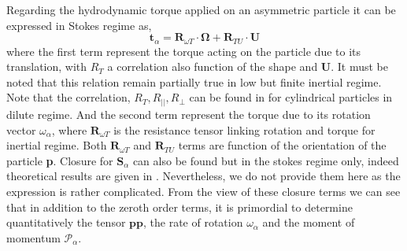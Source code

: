 Regarding the hydrodynamic torque applied on an asymmetric particle it can be expressed in Stokes regime as, 
\begin{equation}
    \textbf{t}_\alpha 
    = 
    \textbf{R}_{\omega T}\cdot \mathbf{\Omega}
     + \textbf{R}_{TU} \cdot \textbf{U} 
\end{equation}
where the first term represent the torque acting on the particle due to its translation,
with $R_T$ a correlation also function of the shape and $\textbf{U}$.
It must be noted that this relation remain partially true in low but finite inertial regime. 
Note that the correlation,  $R_T, R_{||} , R_{\bot}$ can be found in \citet{fintzi2023inertial} for cylindrical particles in dilute regime. 
And the second term represent the torque due to its rotation vector $\omega_\alpha$, where $\textbf{R}_{\omega T}$ is the resistance tensor linking rotation and torque \citet{pierson2021hydrodynamic} for inertial regime.  
Both $\textbf{R}_{\omega T}$ and $\textbf{R}_{TU}$ terms are function of the orientation of the particle \textbf{p}.
Closure for $\textbf{S}_\alpha$ can also be found but in the stokes regime only, 
indeed theoretical results are given in \citet[p 62]{kim2013microhydrodynamics}. Nevertheless, we do not provide them here as the expression is rather complicated. 
From the view of these closure terms we can see that in addition to the zeroth order terms, it is primordial to determine quantitatively the tensor $\textbf{pp}$, the rate of rotation $\omega_\alpha$ and the moment of momentum $\mathcal{P}_\alpha$. 

